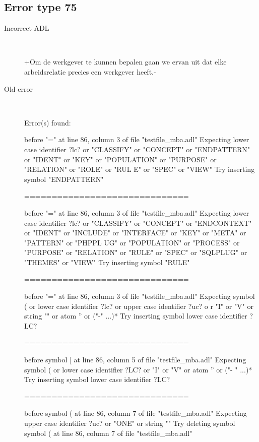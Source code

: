 \hrulefill

\subsection{Error type 75}
  \begin{description}
  \item[Incorrect ADL]~\\
\begin{adl}
{+Om de werkgever te kunnen bepalen gaan we ervan uit dat elke arbeidsrelatie precies een werkgever heeft.-}\end{adl}
  \item[Old error]~\\
\begin{haskell}
Error(s) found:

before "=" at line 86, column 3 of file "testfile_mba.adl"
Expecting lower case identifier ?lc? or "CLASSIFY" or "CONCEPT" or "ENDPATTERN"
or "IDENT" or "KEY" or "POPULATION" or "PURPOSE" or "RELATION" or "ROLE" or "RUL
E" or "SPEC" or "VIEW"
Try inserting symbol "ENDPATTERN"

==============================

before "=" at line 86, column 3 of file "testfile_mba.adl"
Expecting lower case identifier ?lc? or "CLASSIFY" or "CONCEPT" or "ENDCONTEXT"
or "IDENT" or "INCLUDE" or "INTERFACE" or "KEY" or "META" or "PATTERN" or "PHPPL
UG" or "POPULATION" or "PROCESS" or "PURPOSE" or "RELATION" or "RULE" or "SPEC"
or "SQLPLUG" or "THEMES" or "VIEW"
Try inserting symbol "RULE"

==============================

before "=" at line 86, column 3 of file "testfile_mba.adl"
Expecting symbol ( or lower case identifier ?lc? or upper case identifier ?uc? o
r "I" or "V" or string "" or atom '' or ("-" ...)*
Try inserting symbol lower case identifier ?LC?

==============================

before symbol [ at line 86, column 5 of file "testfile_mba.adl"
Expecting symbol ( or lower case identifier ?LC? or "I" or "V" or atom '' or ("-
" ...)*
Try inserting symbol lower case identifier ?LC?

==============================

before symbol ( at line 86, column 7 of file "testfile_mba.adl"
Expecting upper case identifier ?uc? or "ONE" or string ""
Try deleting symbol symbol ( at line 86, column 7 of file "testfile_mba.adl"


\end{haskell}
\end{description}

